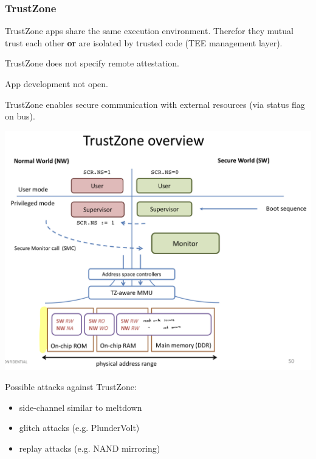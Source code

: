 \subsubsection{TrustZone}
TrustZone apps share the same execution environment. Therefor they mutual trust each other \textbf{or} are isolated by trusted code (TEE management layer).

TrustZone does not specify remote attestation.

App development not open.

TrustZone enables secure communication with external resources (via status flag on bus).

\begin{center}
    \includegraphics[width=0.8\linewidth]{images/mobile_sec_TrustZoneOverview.png}
\end{center}

Possible attacks against TrustZone: \vspace{-1.5mm}
\begin{itemize}
    \item side-channel similar to meltdown
    \item glitch attacks (e.g. PlunderVolt)
    \item replay attacks (e.g. NAND mirroring)
\end{itemize}
